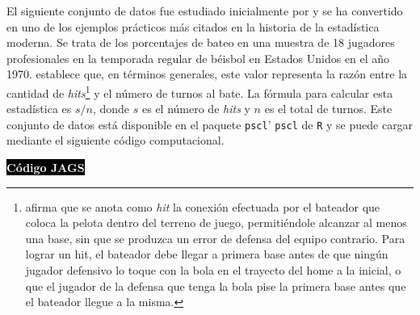     \begin{Eje}\label{Beisbol}
    El siguiente conjunto de datos fue estudiado inicialmente por  y se ha convertido en uno de los ejemplos pr\'acticos m\'as citados en la historia de la estad\'istica moderna. Se trata de los porcentajes de bateo en una muestra de 18 jugadores profesionales en la temporada regular de b\'eisbol en Estados Unidos en el a\~no 1970.  establece que, en t\'erminos generales, este valor representa la raz\'on entre la cantidad de \emph{hits}\footnote{ afirma que se anota como \emph{hit} la conexi\'on efectuada por el bateador que coloca la pelota dentro del terreno de juego, permiti\'endole alcanzar al menos una base, sin que se produzca un error de defensa del equipo contrario. Para lograr un hit, el bateador debe llegar a primera base antes de que ning\'un jugador defensivo lo toque con la bola en el trayecto del home a la inicial, o que el jugador de la defensa que tenga la bola pise la primera base antes que el bateador llegue a la misma.} y el n\'umero de turnos al bate. La f\'ormula para calcular esta estad\'istica es $s/n$, donde $s$ es el n\'umero de \emph{hits} y $n$ es el total de turnos.
    Este conjunto de datos est\'a disponible en el paquete \verb'pscl'' \verb'pscl' de \verb'R' y se puede cargar mediante el siguiente c\'odigo computacional.
    
    \colorbox{black}{\textcolor{white}{\textbf{C\'odigo JAGS}}}
\begin{knitrout}
\color{fgcolor}\begin{kframe}
\begin{alltt}
\end{alltt}



\end{kframe}
\end{knitrout}
\end{Eje}
